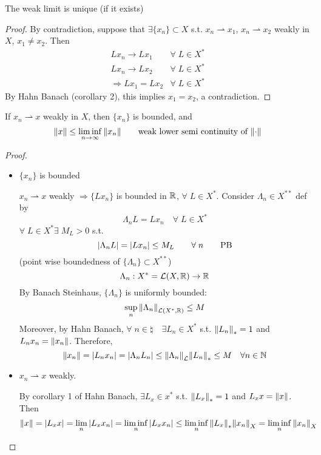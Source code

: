 \begin{proposition}
    The weak limit is unique (if it exists)
\end{proposition}
\begin{proof}
    By contradiction, suppose that \(\exists \{ x_n\} \subset X\) s.t. \(x_n \rightharpoonup x_1\), \(x_n \rightharpoonup x_2\) weakly in \(X\), \(x_1 \neq x_2\). Then
    \[
        \begin{array}{lc}
            Lx_n \to Lx_1 & \forall\; L \in X^* \\
            Lx_n \to L x_2 & \forall\; L \in X^* \\
            \Rightarrow Lx_1 = Lx_2 & \forall\; L \in X^*
    \end{array} 
    \] 
    By Hahn Banach (corollary 2), this implies \(x_1 = x_2\), a contradiction.
\end{proof}

\begin{proposition}
    If \(x_n \rightharpoonup x\) weakly in \(X\), then \(\{x_n\}\) is bounded, and 
    \[
        \norm{x} \leq \liminf_{n \to \infty} \norm{x_n} \tag*{weak lower semi continuity of \(\normdot\)}
    \]
\end{proposition}
\begin{proof}
    \begin{itemize}
        \item \(\{x_n\}\) is bounded
        
        \(x_n \rightharpoonup x\) weakly \(\Rightarrow \{L x_n\}\) is bounded in \(\mathbb{R}\), \(\forall \; L \in X^*\). Consider \(\Lambda_n \in X^{**}\) def by 
        \[
            \Lambda_n L = L x_n \quad \forall\; L \in X^{*}
        \]
        \(\forall\; L \in X^* \exists\; M_L >0 \) s.t.
        \[
            \abs{\Lambda_n L} = \abs{L x_n } \leq M_L \qquad \forall\; n \tag*{PB}
        \]
        (point wise boundedness of \(\{\Lambda_n \} \subset X^{**}\))
        \[
            \Lambda_n: X^{*}= \mathcal{L}(X, \mathbb{R}) \to \mathbb{R}    
        \]
        By Banach Steinhaus, \(\{\Lambda_n\}\) is uniformly bounded:
        \[
            \sup_n \norm{ \Lambda_n}_{\mathcal{L}(X^*, \mathbb{R})} \leq M
        \]
        Moreover, by Hahn Banach, \(\forall \; n \in \natural \quad \exists L_n \in X^*\) s.t. \(\norm{L_n}_* = 1 \) and \(L_n x_n = \norm{x_n}\). Therefore,
        \[
            \norm{x_n} = \abs{L_n x_n} = \abs{\Lambda_n L_n} \leq \norm{\Lambda_n}_\mathcal{L} \norm{L_n}_* \leq M \quad \forall n \in \mathbb{N}
        \] 
        \item \(x_n \rightharpoonup x\) weakly. 
        
        By corollary 1 of Hahn Banach, \(\exists L_x \in x^*\) s.t. \(\norm{L_x}_* = 1\) and \(L_x x = \norm{x}\). Then
        \[
            \norm{x} = \abs{L_x x} = \lim_n \abs{L_x x_n} = \liminf_n \abs{L_x x_n} \leq \liminf_n \norm{L_x}_* \norm{x_n }_X = \liminf_n \norm{x_n }_X
        \]    
    \end{itemize}
\end{proof}

